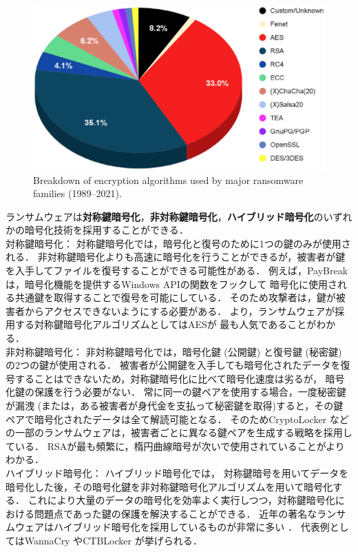\begin{figure}[tb]
  \begin{center}
    \includegraphics[width=0.8\columnwidth]{./doc/img/encrypt_algo.eps}
  \end{center}
  \caption{Breakdown of encryption algorithms used by major ransomware families (1989–2021). \cite{begovic2023cryptographic}}
  \label{fig:encrypt_algo}
\end{figure}

ランサムウェアは\textbf{対称鍵暗号化}，\textbf{非対称鍵暗号化}，\textbf{ハイブリッド暗号化}のいずれかの暗号化技術を採用することができる．
\\
対称鍵暗号化：
対称鍵暗号化では，暗号化と復号のために1つの鍵のみが使用される．
非対称鍵暗号化よりも高速に暗号化を行うことができるが，被害者が鍵を入手してファイルを復号することができる可能性がある．
例えば，PayBreak \cite{kolodenker2017paybreak} は，暗号化機能を提供するWindows APIの関数をフックして
暗号化に使用される共通鍵を取得することで復号を可能にしている．
そのため攻撃者は，鍵が被害者からアクセスできないようにする必要がある．
より，ランサムウェアが採用する対称鍵暗号化アルゴリズムとしてはAESが
最も人気であることがわかる．
\\
非対称鍵暗号化：
非対称鍵暗号化では，暗号化鍵 (公開鍵) と復号鍵 (秘密鍵) の2つの鍵が使用される．
被害者が公開鍵を入手しても暗号化されたデータを復号することはできないため，対称鍵暗号化に比べて暗号化速度は劣るが，
暗号化鍵の保護を行う必要がない．
常に同一の鍵ペアを使用する場合，一度秘密鍵が漏洩 (または，ある被害者が身代金を支払って秘密鍵を取得)すると，その鍵ペアで暗号化されたデータは全て解読可能となる．
そのためCryptoLocker \cite{liao2016behind}などの一部のランサムウェアは，被害者ごとに異なる鍵ペアを生成する戦略を採用している．
RSAが最も頻繁に，楕円曲線暗号が次いで使用されていることがよりわかる．
\\
ハイブリッド暗号化：
ハイブリッド暗号化では，
対称鍵暗号を用いてデータを暗号化した後，その暗号化鍵を非対称鍵暗号化アルゴリズムを用いて暗号化する．
これにより大量のデータの暗号化を効率よく実行しつつ，対称鍵暗号化における問題点であった鍵の保護を解決することができる．
近年の著名なランサムウェアはハイブリッド暗号化を採用しているものが非常に多い \cite{begovic2023cryptographic}．
代表例としてはWannaCry \cite{WannaCry} やCTBLocker \cite{ctb-locker} が挙げられる．

